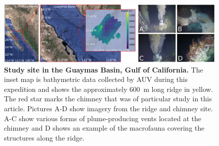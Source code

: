 \begin{figure}[h!]
    \centering
    \includegraphics[width=\columnwidth]{figures/site_summary.png}
    \caption{\textbf{Study site in the Guaymas Basin, Gulf of California.} The inset map is bathymetric data collected by AUV \Sentry during this expedition and shows the approximately \SI{600}{\meter} long ridge in yellow. The red star marks the chimney that was of particular study in this article. Pictures A-D show imagery from the ridge and chimney site. A-C show various forms of plume-producing vents located at the chimney and D shows an example of the macrofauna covering the structures along the ridge.}
    \label{fig:autonomy_site}
\end{figure}

